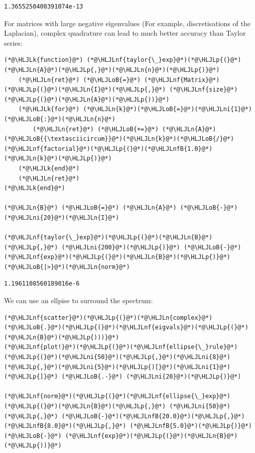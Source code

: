 \documentclass[12pt,a4paper]{article}
\newcommand{\HLJLk}[1]{\textcolor[RGB]{148,91,176}{\textbf{#1}}}
\newcommand{\HLJLn}[1]{#1}
\newcommand{\HLJLnf}[1]{\textcolor[RGB]{66,102,213}{#1}}
\newcommand{\HLJLnfB}[1]{\textcolor[RGB]{59,151,46}{#1}}
\newcommand{\HLJLni}[1]{\textcolor[RGB]{59,151,46}{#1}}
\newcommand{\HLJLoB}[1]{\textcolor[RGB]{102,102,102}{\textbf{#1}}}
\newcommand{\HLJLp}[1]{#1}
\begin{document}
\begin{lstlisting}
1.3655250400391074e-13
\end{lstlisting}


For matrices with large negative eigenvalues (For example, discretisations of the Laplacian), complex quadrature can lead to much better accuracy than Taylor series:


\begin{lstlisting}
(*@\HLJLk{function}@*) (*@\HLJLnf{taylor{\_}exp}@*)(*@\HLJLp{(}@*)(*@\HLJLn{A}@*)(*@\HLJLp{,}@*)(*@\HLJLn{n}@*)(*@\HLJLp{)}@*)
    (*@\HLJLn{ret}@*) (*@\HLJLoB{=}@*) (*@\HLJLnf{Matrix}@*)(*@\HLJLp{(}@*)(*@\HLJLn{I}@*)(*@\HLJLp{,}@*) (*@\HLJLnf{size}@*)(*@\HLJLp{(}@*)(*@\HLJLn{A}@*)(*@\HLJLp{))}@*)
    (*@\HLJLk{for}@*) (*@\HLJLn{k}@*)(*@\HLJLoB{=}@*)(*@\HLJLni{1}@*)(*@\HLJLoB{:}@*)(*@\HLJLn{n}@*)
        (*@\HLJLn{ret}@*) (*@\HLJLoB{+=}@*) (*@\HLJLn{A}@*)(*@\HLJLoB{{\textasciicircum}}@*)(*@\HLJLn{k}@*)(*@\HLJLoB{/}@*)(*@\HLJLnf{factorial}@*)(*@\HLJLp{(}@*)(*@\HLJLnfB{1.0}@*)(*@\HLJLn{k}@*)(*@\HLJLp{)}@*)
    (*@\HLJLk{end}@*)
    (*@\HLJLn{ret}@*)
(*@\HLJLk{end}@*)

(*@\HLJLn{B}@*) (*@\HLJLoB{=}@*) (*@\HLJLn{A}@*) (*@\HLJLoB{-}@*) (*@\HLJLni{20}@*)(*@\HLJLn{I}@*)

(*@\HLJLnf{taylor{\_}exp}@*)(*@\HLJLp{(}@*)(*@\HLJLn{B}@*)(*@\HLJLp{,}@*) (*@\HLJLni{200}@*)(*@\HLJLp{)}@*) (*@\HLJLoB{-}@*)(*@\HLJLnf{exp}@*)(*@\HLJLp{(}@*)(*@\HLJLn{B}@*)(*@\HLJLp{)}@*) (*@\HLJLoB{|>}@*)(*@\HLJLn{norm}@*)
\end{lstlisting}

\begin{lstlisting}
1.1961108560189016e-6
\end{lstlisting}


We can use an ellpise to surround the spectrum:


\begin{lstlisting}
(*@\HLJLnf{scatter}@*)(*@\HLJLp{(}@*)(*@\HLJLn{complex}@*)(*@\HLJLoB{.}@*)(*@\HLJLp{(}@*)(*@\HLJLnf{eigvals}@*)(*@\HLJLp{(}@*)(*@\HLJLn{B}@*)(*@\HLJLp{)))}@*)
(*@\HLJLnf{plot!}@*)(*@\HLJLp{(}@*)(*@\HLJLnf{ellipse{\_}rule}@*)(*@\HLJLp{(}@*)(*@\HLJLni{50}@*)(*@\HLJLp{,}@*)(*@\HLJLni{8}@*)(*@\HLJLp{,}@*)(*@\HLJLni{5}@*)(*@\HLJLp{)[}@*)(*@\HLJLni{1}@*)(*@\HLJLp{]}@*) (*@\HLJLoB{.-}@*) (*@\HLJLni{20}@*)(*@\HLJLp{)}@*)

(*@\HLJLnf{norm}@*)(*@\HLJLp{(}@*)(*@\HLJLnf{ellipse{\_}exp}@*)(*@\HLJLp{(}@*)(*@\HLJLn{B}@*)(*@\HLJLp{,}@*) (*@\HLJLni{50}@*)(*@\HLJLp{,}@*) (*@\HLJLoB{-}@*)(*@\HLJLnfB{20.0}@*)(*@\HLJLp{,}@*) (*@\HLJLnfB{8.0}@*)(*@\HLJLp{,}@*) (*@\HLJLnfB{5.0}@*)(*@\HLJLp{)}@*) (*@\HLJLoB{-}@*) (*@\HLJLnf{exp}@*)(*@\HLJLp{(}@*)(*@\HLJLn{B}@*)(*@\HLJLp{))}@*)
\end{lstlisting}
\end{document}
